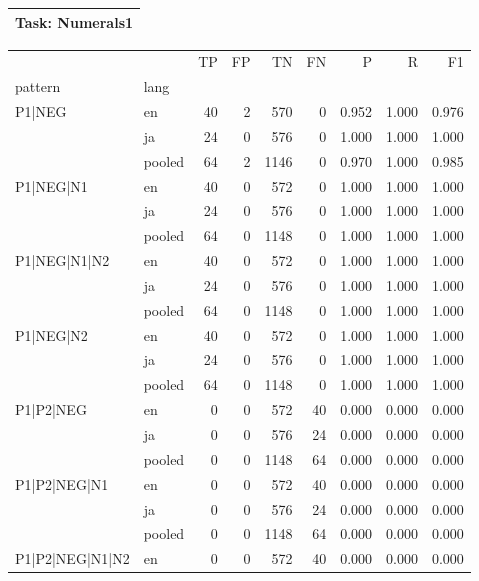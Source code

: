 
\begin{table}[h!]
\centering
\begin{tabular}{p{}}
\toprule
\textbf{Task: Numerals1} \\
\midrule
\end{tabular}
\vspace{10pt}
\begin{tabular}{llrrrrrrr}
\toprule
 &  & TP & FP & TN & FN & P & R & F1 \\
pattern & lang &  &  &  &  &  &  &  \\
\midrule
\multirow[t]{3}{*}{P1|NEG} & en & 40 & 2 & 570 & 0 & 0.952 & 1.000 & 0.976 \\
 & ja & 24 & 0 & 576 & 0 & 1.000 & 1.000 & 1.000 \\
 & pooled & 64 & 2 & 1146 & 0 & 0.970 & 1.000 & 0.985 \\
\cline{1-9}
\multirow[t]{3}{*}{P1|NEG|N1} & en & 40 & 0 & 572 & 0 & 1.000 & 1.000 & 1.000 \\
 & ja & 24 & 0 & 576 & 0 & 1.000 & 1.000 & 1.000 \\
 & pooled & 64 & 0 & 1148 & 0 & 1.000 & 1.000 & 1.000 \\
\cline{1-9}
\multirow[t]{3}{*}{P1|NEG|N1|N2} & en & 40 & 0 & 572 & 0 & 1.000 & 1.000 & 1.000 \\
 & ja & 24 & 0 & 576 & 0 & 1.000 & 1.000 & 1.000 \\
 & pooled & 64 & 0 & 1148 & 0 & 1.000 & 1.000 & 1.000 \\
\cline{1-9}
\multirow[t]{3}{*}{P1|NEG|N2} & en & 40 & 0 & 572 & 0 & 1.000 & 1.000 & 1.000 \\
 & ja & 24 & 0 & 576 & 0 & 1.000 & 1.000 & 1.000 \\
 & pooled & 64 & 0 & 1148 & 0 & 1.000 & 1.000 & 1.000 \\
\cline{1-9}
\multirow[t]{3}{*}{P1|P2|NEG} & en & 0 & 0 & 572 & 40 & 0.000 & 0.000 & 0.000 \\
 & ja & 0 & 0 & 576 & 24 & 0.000 & 0.000 & 0.000 \\
 & pooled & 0 & 0 & 1148 & 64 & 0.000 & 0.000 & 0.000 \\
\cline{1-9}
\multirow[t]{3}{*}{P1|P2|NEG|N1} & en & 0 & 0 & 572 & 40 & 0.000 & 0.000 & 0.000 \\
 & ja & 0 & 0 & 576 & 24 & 0.000 & 0.000 & 0.000 \\
 & pooled & 0 & 0 & 1148 & 64 & 0.000 & 0.000 & 0.000 \\
\cline{1-9}
\multirow[t]{3}{*}{P1|P2|NEG|N1|N2} & en & 0 & 0 & 572 & 40 & 0.000 & 0.000 & 0.000 \\

\end{tabular}
\end{table}
